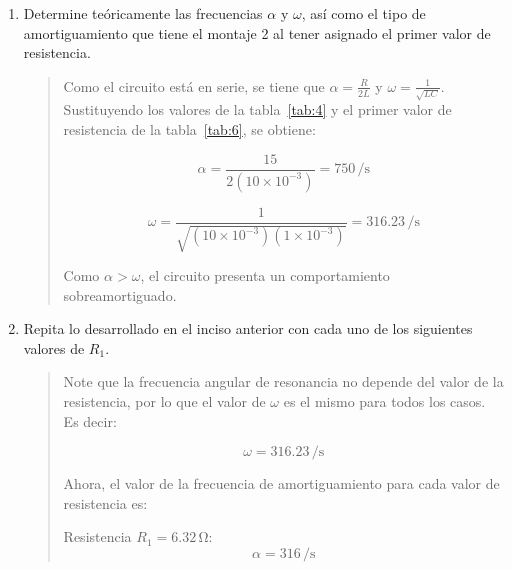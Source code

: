 \documentclass{article}
\begin{document}
\begin{enumerate}[label=\alph*.-]
\begin{quote}
            Ahora utilizaremos la fórmula del error relativo porcentual para comparar los resultados teóricos y experimentales. La fórmula es:
            \[
                E_{\%} = \frac{\left|V_{aprx} - V_{teor}\right|}{V_{teor}} \times 100\%
            \]

            Al reemplazar los valores obtenidos, tenemos:
            \[
                E_{\%} = \frac{\left|141.17 - 141.42\right|}{141.42} \times 100\% \approx 0.18\%
            \]
        \end{quote}

        \item Determine teóricamente las frecuencias $\alpha$ y $\omega$, así como el tipo de amortiguamiento que tiene el montaje 2 al tener asignado el primer valor de resistencia.
        
        \begin{quote}
            Como el circuito está en serie, se tiene que $\alpha = \frac{R}{2L}$ y $\omega = \frac{1}{\sqrt{LC}}$. Sustituyendo los valores de la tabla~\ref{tab:4} y el primer valor de resistencia de la tabla~\ref{tab:6}, se obtiene:

            \[
                \alpha = \frac{15}{2(10\times10^{-3})} = 750\,\si{\per\second}
            \]

            \[
                \omega = \frac{1}{\sqrt{(10\times10^{-3})(1\times10^{-3})}} = 316.23\,\si{\per\second}
            \]

            Como $\alpha > \omega$, el circuito presenta un comportamiento sobreamortiguado.
        \end{quote}

        \item Repita lo desarrollado en el inciso anterior con cada uno de los siguientes valores de $R_1$.
        
        \begin{quote}
            Note que la frecuencia angular de resonancia no depende del valor de la resistencia, por lo que el valor de $\omega$ es el mismo para todos los casos. Es decir:

            \[
                \omega = 316.23\,\si{\per\second}
            \]

            Ahora, el valor de la frecuencia de amortiguamiento para cada valor de resistencia es:

            Resistencia $R_1 = 6.32\,\unit{\ohm}$:
            \[
                \alpha = 316\,\si{\per\second}
            \]


\end{quote}
\end{enumerate}
\end{document}
